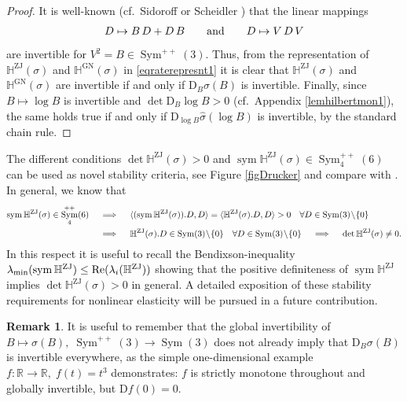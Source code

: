 \documentclass[10pt]{article}
\newcounter{theoremCounter}
\numberwithin{theoremCounter}{section}
\theoremstyle{plain}
\theoremstyle{definition}
\newtheorem{rem}[theoremCounter]{Remark}
\newcommand{\R}{\mathbb{R}}
\newcommand{\DD}{\mathrm{D}}
\DeclareMathOperator{\Sym}{Sym}
\DeclareMathOperator{\sym}{sym}
\DeclareMathOperator{\ZJ}{ZJ}
\DeclareMathOperator{\GN}{GN}
\def\H{\mathbb{H}}
\numberwithin{equation}{section}
\begin{document}
%
\begin{proof}
It is well-known (cf.~Sidoroff \cite{sidoroff1974restrictions} or Scheidler \cite{scheidler1994}) that the linear mappings
	\begin{align}
	D \mapsto B \, D + D \, B \qquad \textnormal{and} \qquad D \mapsto V \, D \, V
	\end{align}
are invertible for $V^2 = B \in \Sym^{++}(3)$. Thus, from the representation of $\H^{\ZJ}(\sigma)$ and $\H^{\GN}(\sigma)$ in \eqref{eqraterepresnt1} it is clear that $\H^{\ZJ}(\sigma)$ and $\H^{\GN}(\sigma)$ are invertible if and only if $\DD_B \sigma(B)$ is invertible. Finally, since $B \mapsto \log B$ is invertible and $\det \DD_B \log B > 0$ (cf.~Appendix \ref{lemhilbertmon1}), the same holds true if and only if $\DD_{\log B} \widehat \sigma(\log B)$ is invertible, by the standard chain rule.
\end{proof}
The different conditions $\det \H^{\ZJ}(\sigma)>0$ and $\sym \H^{\ZJ}(\sigma) \in \Sym^{++}_4(6)$ can be used as novel stability criteria, see Figure \ref{figDrucker} and compare with \cite{jog2013conditions}. In general, we know that
	\begin{align}
	\sym \H^{\ZJ}(\sigma) \in \Sym^{++}_4(6) \quad &\implies \quad \langle (\sym \H^{\ZJ}(\sigma)). D, D \rangle = \langle \H^{\ZJ}(\sigma).D, D \rangle > 0 \quad \forall D \in \Sym(3) \! \setminus \! \{0\} \\
	&\implies \quad \H^{\ZJ}(\sigma).D \in \Sym(3) \! \setminus \! \{0\} \quad\forall D \in \Sym(3) \! \setminus \! \{0\}\quad \implies \quad \det \H^{\ZJ}(\sigma) \neq 0. \notag
	\end{align}
In this respect it is useful to recall the Bendixson-inequality \cite{bendixson1902} $\lambda_{\min}(\sym \H^{\ZJ}) \le \textnormal{Re}(\lambda_i(\H^{\ZJ}))$ showing that the positive definiteness of $\sym \H^{\ZJ}$ implies $ \det \H^{\ZJ}(\sigma) > 0$ in general. A detailed exposition of these stability requirements for nonlinear elasticity will be pursued in a future contribution.

%
\begin{rem}
It is useful to remember that the global invertibility of $B \mapsto \sigma(B), \; \Sym^{++}(3) \to \Sym(3)$ does not already imply that $\DD_B \sigma(B)$ is invertible everywhere, as the simple one-dimensional example
$f\colon \R \to \R, \; f(t) = t^3$ demonstrates:
$f$ is strictly monotone throughout and globally invertible, but $\DD f(0) = 0$.
\end{rem}
%
\end{document}
